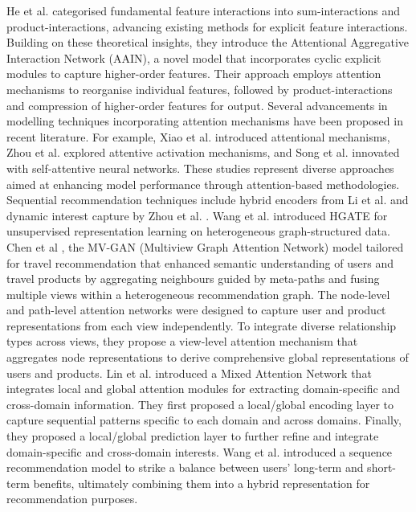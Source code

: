     He et al. \cite{he2023aain} categorised fundamental feature interactions into sum-interactions and product-interactions, advancing existing methods for explicit feature interactions. Building on these theoretical insights, they introduce the Attentional Aggregative Interaction Network (AAIN), a novel model that incorporates cyclic explicit modules to capture higher-order features. Their approach employs attention mechanisms to reorganise individual features, followed by product-interactions and compression of higher-order features for output. Several advancements in modelling techniques incorporating attention mechanisms have been proposed in recent literature. For example, Xiao et al. \cite{xiao2017attentional} introduced attentional mechanisms, Zhou et al. \cite{zhou2018deep} explored attentive activation mechanisms, and Song et al. \cite{song2019autoint} innovated with self-attentive neural networks. These studies represent diverse approaches aimed at enhancing model performance through attention-based methodologies. Sequential recommendation techniques include hybrid encoders from Li et al. \cite{li2017neural} and dynamic interest capture by Zhou et al. \cite{zhou2019deep}. Wang et al. \cite{wang2021hgate} introduced HGATE for unsupervised representation learning on heterogeneous graph-structured data. Chen et al \cite{chen2022multi},  the MV-GAN (Multiview Graph Attention Network) model tailored for travel recommendation that enhanced semantic understanding of users and travel products by aggregating neighbours guided by meta-paths and fusing multiple views within a heterogeneous recommendation graph. The node-level and path-level attention networks were  designed to capture user and product representations from each view independently. To integrate diverse relationship types across views, they propose a view-level attention mechanism that aggregates node representations to derive comprehensive global representations of users and products. Lin et al. \cite{lin2024mixed} introduced a Mixed Attention Network that integrates local and global attention modules for extracting domain-specific and cross-domain information. They first proposed a local/global encoding layer to capture sequential patterns specific to each domain and across domains. Finally, they proposed a local/global prediction layer to further refine and integrate domain-specific and cross-domain interests. Wang et al. \cite{wang2024sequential} introduced a sequence recommendation model to strike a balance between users' long-term and short-term benefits, ultimately combining them into a hybrid representation for recommendation purposes.
    
